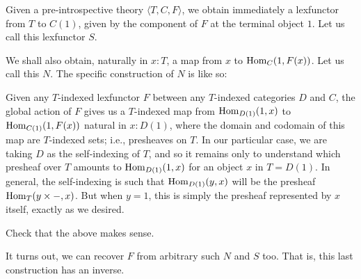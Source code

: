 \begin{construction}
Given a pre-introspective theory $\langle T, C, F \rangle$, we obtain immediately a lexfunctor from $T$ to $C(1)$, given by the component of $F$ at the terminal object $1$. Let us call this lexfunctor $S$.

We shall also obtain, naturally in $x : T$, a map from $x$ to $\mathrm{Hom}_C(1, F(x))$. Let us call this $N$. The specific construction of $N$ is like so: 

\begin{comment}
Note that in a general pre-introspective theory, $\Hom_C(1, F(x))$ amounts to a $T$-indexed set, i.e. a presheaf over $T$, which may or may not be representable. However, if we are dealing with an introspective theory, the presheaf corresponding to $\Hom_C(1, F(x))$ will be representable (as it is given by pulling back a global object of $\Ob(C)^2$ along the domain and codomain projections from $\Mor(C)$, with each of these being representable). By the Yoneda lemma, we can in any case speak of all of this equivalently as a function from $\Hom_T(t, x)$ to $\Hom_{C(t)}(1, F(t)(x))$, natural in $t$ and $x$ both from $T$
\end{comment}

Given any $T$-indexed lexfunctor $F$ between any $T$-indexed categories $D$ and $C$, the global action of $F$ gives us a $T$-indexed map from $\mathrm{Hom}_{D(1)}(1, x)$ to $\mathrm{Hom}_{C(1)}(1, F(x))$ natural in $x : D(1)$, where the domain and codomain of this map are $T$-indexed sets; i.e., presheaves on $T$. In our particular case, we are taking $D$ as the self-indexing of $T$, and so it remains only to understand which presheaf over $T$ amounts to $\mathrm{Hom}_{D(1)}(1, x)$ for an object $x$ in $T = D(1)$. In general, the self-indexing is such that $\mathrm{Hom}_{D(1)}(y, x)$ will be the presheaf $\mathrm{Hom}_T(y \times -, x)$. But when $y = 1$, this is simply the presheaf represented by $x$ itself, exactly as we desired.
\end{construction}

\begin{TODOblock}
Check that the above makes sense.
\end{TODOblock}

It turns out, we can recover $F$ from arbitrary such $N$ and $S$ too. That is, this last construction has an inverse. \TODO